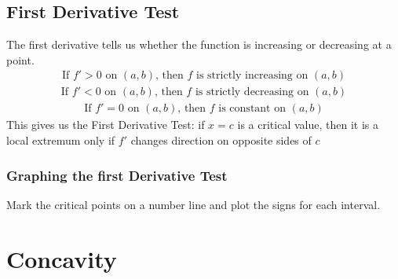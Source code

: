 \documentclass{article}
\begin{document}
    \subsection{First Derivative Test}
        The first derivative tells us whether the function is increasing or decreasing at a point.
        \begin{gather*}
            \text{If } f'> 0 \text{ on } (a, b) \text{, then } f \text{ is strictly increasing on } (a, b)
        \end{gather*}
        \begin{gather*}
            \text{If } f'< 0 \text{ on } (a, b) \text{, then } f \text{ is strictly decreasing on } (a, b)
        \end{gather*}
        \begin{gather*}
            \text{If } f'= 0 \text{ on } (a, b) \text{, then } f \text{ is constant on } (a, b)
        \end{gather*}
        This gives us the First Derivative Test: if \(x=c\) is a critical value, then it is a local extremum only if \(f'\) changes direction on opposite sides of \(c\)
        \subsubsection{Graphing the first Derivative Test}
            Mark the critical points on a number line and plot the signs for each interval.
\clearpage
\section{Concavity}
\end{document}
